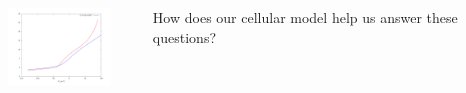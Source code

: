 \documentclass{beamer}
\begin{document}
\begin{frame}
\begin{columns}
    \begin{column}{1.6cm}
    \end{column}
    \begin{column}{2cm}
      \includegraphics[width=3cm]{../results/pdf/20110506/membrane_behaviour-vi}
    \end{column}
    \begin{column}{0.35cm}
    \end{column}
    \begin{column}{6.5cm}
      How does our cellular model help us answer these questions?
    \end{column}
  \end{columns}
\end{frame}

\end{document}
